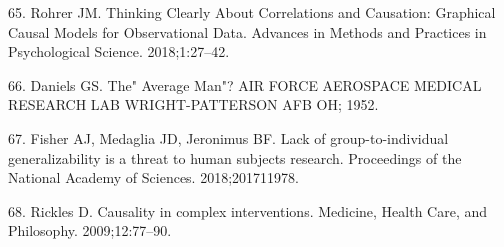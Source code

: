 \documentclass[english,man,floatsintext]{apa6}
\begin{document}
\leavevmode\hypertarget{ref-rohrerThinkingClearlyCorrelations2018}{}%
65. Rohrer JM. Thinking Clearly About Correlations and Causation: Graphical Causal Models for Observational Data. Advances in Methods and Practices in Psychological Science. 2018;1:27--42.

\leavevmode\hypertarget{ref-danielsAverageMan1952}{}%
66. Daniels GS. The" Average Man"? AIR FORCE AEROSPACE MEDICAL RESEARCH LAB WRIGHT-PATTERSON AFB OH; 1952.

\leavevmode\hypertarget{ref-fisherLackGrouptoindividualGeneralizability2018}{}%
67. Fisher AJ, Medaglia JD, Jeronimus BF. Lack of group-to-individual generalizability is a threat to human subjects research. Proceedings of the National Academy of Sciences. 2018;201711978.

\leavevmode\hypertarget{ref-ricklesCausalityComplexInterventions2009}{}%
68. Rickles D. Causality in complex interventions. Medicine, Health Care, and Philosophy. 2009;12:77--90.

\endgroup
\end{document}
